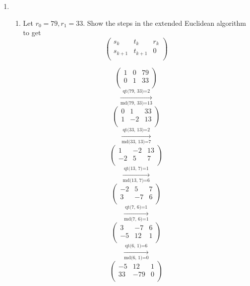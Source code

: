 \documentclass[11pt]{article}
\begin{document}
\begin{enumerate}
\newpage %
\item 
\begin{enumerate}
\item Let $r_0 = 79, r_1 = 33$.  Show the steps in the extended Euclidean algorithm to get
\begin{equation*}
\left(
\begin{array}{ccc}
s_k & t_k & r_k \\
s_{k+1} & t_{k+1} & 0 \\
\end{array} \right)
\end{equation*}

\begin{equation*}
\left(
\begin{array}{ccc}
 1 & 0 & 79 \\
 0 & 1 & 33 \\
\end{array}
\right)
\end{equation*}
$$\xrightarrow[\text{md(79, 33)=13}]{\text{qt(79, 33)=2}}$$
\begin{equation*}
\left(
\begin{array}{ccc}
 0 & 1 & 33 \\
 1 & -2 & 13 \\
\end{array}
\right)
\end{equation*}
$$\xrightarrow[\text{md(33, 13)=7}]{\text{qt(33, 13)=2}}$$
\begin{equation*}
\left(
\begin{array}{ccc}
 1 & -2 & 13 \\
 -2 & 5 & 7 \\
\end{array}
\right)
\end{equation*}
$$\xrightarrow[\text{md(13, 7)=6}]{\text{qt(13, 7)=1}}$$
\begin{equation*}
\left(
\begin{array}{ccc}
 -2 & 5 & 7 \\
 3 & -7 & 6 \\
\end{array}
\right)
\end{equation*}
$$\xrightarrow[\text{md(7, 6)=1}]{\text{qt(7, 6)=1}}$$
\begin{equation*}
\left(
\begin{array}{ccc}
 3 & -7 & 6 \\
 -5 & 12 & 1 \\
\end{array}
\right)
\end{equation*}
$$\xrightarrow[\text{md(6, 1)=0}]{\text{qt(6, 1)=6}}$$
\begin{equation*}
\left(
\begin{array}{ccc}
 -5 & 12 & 1 \\
 33 & -79 & 0 \\
\end{array}
\right)
\end{equation*}



\end{enumerate}
\end{enumerate}
\end{document}
